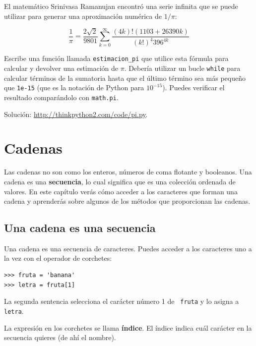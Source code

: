 \documentclass[10pt]{book}
\begin{document}
\begin{exercise}

El matemático Srinivasa Ramanujan encontró una
serie infinita
que se puede utilizar para generar una aproximación
numérica de $1 / \pi$:

\[ \frac{1}{\pi} = \frac{2\sqrt{2}}{9801}
\sum^\infty_{k=0} \frac{(4k)!(1103+26390k)}{(k!)^4 396^{4k}} \]

Escribe una función llamada \verb"estimacion_pi" que utilice esta fórmula
para calcular y devolver una estimación de $\pi$.  Debería utilizar un bucle {\tt while}
para calcular términos de la sumatoria hasta que el último término sea
más pequeño que {\tt 1e-15} (que es la notación de Python para $10^{-15}$).
Puedes verificar el resultado comparándolo con {\tt math.pi}.

Solución: \url{http://thinkpython2.com/code/pi.py}.

\end{exercise}


\chapter{Cadenas}
\label{strings}

Las cadenas no son como los enteros, números de coma flotante y booleanos.  Una cadena
es una {\bf secuencia}, lo cual significa que es
una colección ordenada de valores.  En este capítulo verás
cómo acceder a los caracteres que forman una cadena y
aprenderás sobre algunos de los métodos que proporcionan las cadenas.


\section{Una cadena es una secuencia}

Una cadena es una secuencia de caracteres.
Puedes acceder a los caracteres uno a la vez con el
operador de corchetes:

\begin{verbatim}
>>> fruta = 'banana'
>>> letra = fruta[1]
\end{verbatim}
%
La segunda sentencia selecciona el carácter número 1 de {\tt
fruta} y lo asigna a {\tt letra}.

La expresión en los corchetes se llama {\bf índice}.
El índice indica cuál carácter en la secuencia
quieres (de ahí el nombre).
\end{document}
